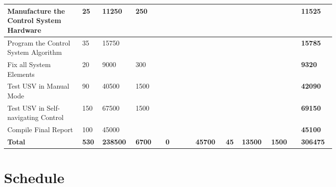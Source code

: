 \begin{landscape}
\begin{tabular}{|p{0.2\linewidth}|p{0.03\linewidth}|p{0.06\linewidth}|p{0.08\linewidth}|p{0.08\linewidth}|p{0.08\linewidth}|p{0.03\linewidth}|p{0.06\linewidth}|p{0.08\linewidth}|p{0.08\linewidth}|}
	\hline
	Manufacture the Control System Hardware & 25 & 11250 & 250 &   &   &   &   &   & \textbf{11525} \\
	\hline
	Program the Control System Algorithm & 35 & 15750 &   &   &   &   &   &   & \textbf{15785 }\\
	\hline
	Fix all System Elements & 20 & 9000 & 300 &   &   &   &   &   & \textbf{9320 }\\
	\hline
	Test USV in Manual Mode & 90 & 40500 & 1500 &   &   &   &   &   & \textbf{42090 }\\
	\hline
	Test USV in Self-navigating Control & 150 & 67500 & 1500 &   &   &   &   &   & \textbf{69150 }\\
	\hline
	Compile Final Report & 100 & 45000 &   &   &   &   &   &   & \textbf{45100 }\\
	\hline
	\textbf{Total} & \textbf{530} & \textbf{238500} & \textbf{6700} & \textbf{0} & \textbf{45700} & \textbf{45} & \textbf{13500} & \textbf{1500} & \textbf{306475} \\
	\hline
\end{tabular}
\end{landscape}
\normalsize
\section{Schedule}
